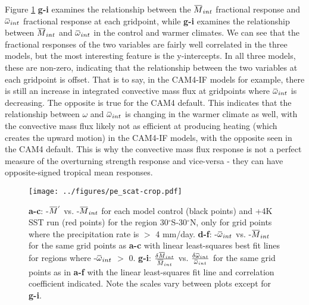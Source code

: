 \documentclass[letterpaper,12pt,titlepage,oneside,final]{book}
\newcommand{\overbar}[1]{\mkern 1.5mu\overline{\mkern-1.5mu#1\mkern-1.5mu}\mkern 1.5mu}
\begin{document}
Figure \ref{fig:pe} \textbf{g-i} examines the relationship between the $\overbar{M}_{int}$ fractional response and $\overbar{\omega}_{int}$ fractional response at each gridpoint, while \textbf{g-i} examines the relationship between $\overbar{M}_{int}$ and $\overbar{\omega}_{int}$ in the control and warmer climates. We can see that the fractional responses of the two variables are fairly well correlated in the three models, but the most interesting feature is the y-intercepts. In all three models, these are non-zero, indicating that the relationship between the two variables at each gridpoint is offset. That is to say, in the CAM4-IF models for example, there is still an increase in integrated convective mass flux at gridpoints where $\overbar{\omega}_{int}$ is decreasing. The opposite is true for the CAM4 default. This indicates that the relationship between $\omega$ and 
$\overbar{\omega}_{int}$ is changing in the warmer climate as well, with the convective mass flux likely not as efficient at producing heating (which creates the upward motion) in the CAM4-IF models, with the opposite seen in the CAM4 default. This is why the convective mass flux response is not a perfect measure of the overturning strength response and vice-versa - they can have opposite-signed tropical mean responses.


\begin{figure}[H]
\centering
\noindent\texttt{[image: ../figures/pe\_scat-crop.pdf]}\hfill
\caption{\footnotesize \footnotesize \textbf{a-c}: -$\overbar{M}^{'}$ vs. -$\overbar{M}_{int}$ for each model control (black points) and +4K SST run (red points) for the region 30$^\circ$S-30$^\circ$N, only for grid points where the precipitation rate is $>$ 4 mm/day. \textbf{d-f}: -$\overbar{\omega}_{int}$ vs. -$\overbar{M}_{int}$ for the same grid points as \textbf{a-c} with linear least-squares best fit lines for regions where -$\overbar{\omega}_{int}$ $>$ 0. \textbf{g-i}: $\frac{\delta{\overbar{M}_{int}}}{\overbar{M}_{int}}$ vs. $\frac{\delta{\overbar{\omega}_{int}}}{\overbar{\omega}_{int}}$ for the same grid points as in \textbf{a-f} with the linear least-squares fit line and correlation coefficient indicated. Note the scales vary between plots except for \textbf{g-i}.}
\label{fig:pe}
\end{figure}
\end{document}
